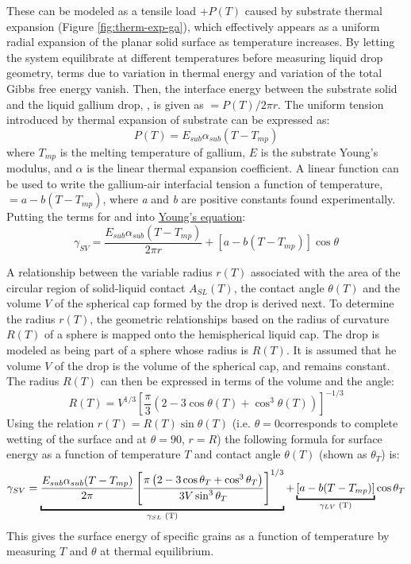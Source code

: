 These can be modeled as a tensile load +$P(T)$ caused by substrate thermal expansion (Figure \ref{fig:therm-exp-ga}), which effectively appears as a uniform radial expansion of the planar solid surface as temperature increases. By letting the system equilibrate at different temperatures before measuring liquid drop geometry, terms due to variation in thermal energy and variation of the total Gibbs free energy vanish. Then, the interface energy between the substrate solid and the liquid gallium drop, \gamSL, is given as \gamSL$=P(T)/2\pi r$. The uniform tension introduced by thermal expansion of substrate can be expressed as:
\begin{equation}\label{uniform-tension}
	P(T) = E_{sub}\alpha_{sub}(T-T_{mp})
\end{equation}
where $T_{mp}$ is the melting temperature of gallium, $E$  is the substrate Young’s modulus, and $\alpha$ is the linear thermal expansion coefficient. A linear function can be used to write the gallium-air interfacial tension a function of temperature, \gamLV $= a-b(T-T_{mp})$, where \textit{a} and \textit{b} are positive constants found experimentally.\cite{Hardy1985,Alchagirov2005} Putting the terms for \gamSL and \gamSV into \hyperlink{youngeqn}{Young’s equation}\cite{Rudawska2009,Tadmor2004}:
\begin{equation*}%
	\gamma_{SV} =  \frac{E_{sub}\alpha_{sub}(T-T_{mp})}{2\pi r} + \left[a-b(T-T_{mp})\right]\cos\theta
\end{equation*}

A relationship between the variable radius $r(T)$ associated with the area of the circular region of solid-liquid contact $A_{SL}(T)$, the contact angle $\theta(T)$ and the volume $V$ of the spherical cap formed by the drop is derived next. To determine the radius $r(T)$, the geometric relationships based on the radius of curvature $R(T)$ of a sphere is mapped onto the hemispherical liquid cap. The drop is modeled as being part of a sphere whose radius is $R(T)$. It is assumed that he volume $V$ of the drop is the volume of the spherical cap, and remains constant. The radius $R(T)$ can then be expressed in terms of the volume and the angle:
\begin{equation*}\label{drop-geom}
	R(T) = V^{1/3} \left[\frac{\pi}{3} \left(2-3\cos\theta(T)+\cos^{3}\theta(T)\right)\right]^{-1/3}
\end{equation*}
Using the relation $r(T)=R(T)\sin\theta(T)$ (i.e. $\theta=$0\degree corresponds to complete wetting of the surface and at $\theta=90$\degree,  $r=R$) the following formula for surface energy as a function of temperature $T$ and contact angle $\theta(T)$ (shown as $\theta_{T}$) is:
\begin{equation}\label{youngs-eqn-ga}
	\gamma_{SV} =  \underbracket{\frac{E_{sub}\alpha_{sub}(T-T_{mp})}{2\pi}\left[\frac{\pi\left(2-3\cos\theta_{T}+\cos^{3}\theta_{T}\right)}{3V\sin^{3}\theta_{T}} \right]^{1/3}}_{\text{\gamSL(T)}} + \underbracket{\left[a-b(T-T_{mp})\right]}_{\text{\gamLV(T)}} \cos\theta_{T}
\end{equation}
This gives the surface energy \gamSV of specific grains as a function of temperature by measuring $T$ and $\theta$ at thermal equilibrium.

